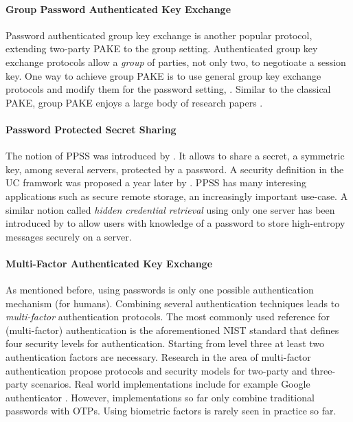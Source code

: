 \paragraph{Group Password Authenticated Key Exchange}
Password authenticated group key exchange is another popular protocol, extending two-party \ac{PAKE} to the group setting.
Authenticated group key exchange protocols allow a \emph{group} of parties, not only two, to negotioate a session key.
One way to achieve group \ac{PAKE} is to use general group key exchange protocols and modify them for the password setting, \eg \cite{Bresson02,BrChPo05}.
Similar to the classical \ac{PAKE}, group \ac{PAKE} enjoys a large body of research papers \cite{Kim2004,Abdalla2006,Bohli2006,Dutta2006,AbdallaP06,AbdallaBVS07,AbdallaCCP09,AbdallaCGP11}.

\paragraph{Password Protected Secret Sharing}
The notion of \ac{PPSS} was introduced by \citet{Bagherzandi2011}.
It allows to share a secret, \eg a symmetric key, among several servers, protected by a password. 
A security definition in the \acl{UC} framwork was proposed a year later by \citet{Camenisch2012}.
\ac{PPSS} has many interesing applications such as secure remote storage, an increasingly important use-case.
A similar notion called \emph{hidden credential retrieval} using only one server has been introduced by \citet{Boyen09} to allow users with knowledge of a password to store high-entropy messages securely on a server.



\paragraph{Multi-Factor Authenticated Key Exchange}
As mentioned before, using passwords is only one possible authentication mechanism (for humans).
Combining several authentication techniques leads to \emph{multi-factor} authentication protocols.
The most commonly used reference for (multi-factor) authentication is the aforementioned \ac{NIST} standard \cite{Burr11} that defines four security levels for authentication.
Starting from level three at least two authentication factors are necessary.
Research in the area of multi-factor authentication \cite{PointchevalZ08,SUC10,LiuWM10,HaoC12} propose protocols and security models for two-party and three-party scenarios.
Real world implementations include for example Google authenticator \cite{GAuthenticator}.
However, implementations so far only combine traditional passwords with \aclp{OTP}.
Using biometric factors is rarely seen in practice so far.


